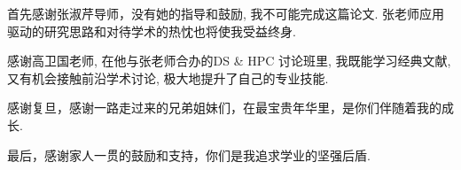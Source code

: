 \begin{thanks}
  首先感谢张淑芹导师，没有她的指导和鼓励, 我不可能完成这篇论文. 
  张老师应用驱动的研究思路和对待学术的热忱也将使我受益终身.

  感谢高卫国老师, 在他与张老师合办的DS \& HPC 讨论班里, 我既能学习经典文献, 
  又有机会接触前沿学术讨论, 极大地提升了自己的专业技能.

  感谢复旦，感谢一路走过来的兄弟姐妹们，在最宝贵年华里，是你们伴随着我的成长.

  最后，感谢家人一贯的鼓励和支持，你们是我追求学业的坚强后盾.

\end{thanks}
